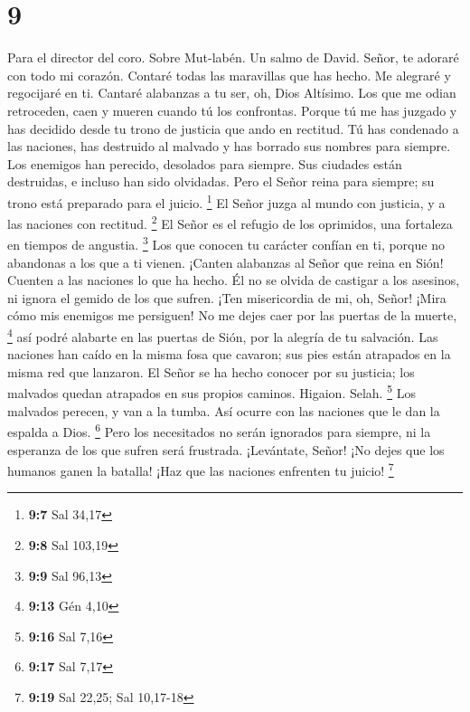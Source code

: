 \hypertarget{section-8}{%
\section{9}\label{section-8}}

Para el director del coro. Sobre Mut-labén. Un salmo de David.
 Señor, te adoraré con todo mi corazón. Contaré todas las
maravillas que has hecho.  Me alegraré y regocijaré en ti.
Cantaré alabanzas a tu ser, oh, Dios Altísimo.  Los que me
odian retroceden, caen y mueren cuando tú los confrontas. 
Porque tú me has juzgado y has decidido desde tu trono de justicia que
ando en rectitud.  Tú has condenado a las naciones, has
destruido al malvado y has borrado sus nombres para siempre.
 Los enemigos han perecido, desolados para siempre. Sus
ciudades están destruidas, e incluso han sido olvidadas. 
Pero el Señor reina para siempre; su trono está preparado para el
juicio. \footnote{\textbf{9:7} Sal 34,17}  El Señor juzga al
mundo con justicia, y a las naciones con rectitud. \footnote{\textbf{9:8}
  Sal 103,19}  El Señor es el refugio de los oprimidos, una
fortaleza en tiempos de angustia. \footnote{\textbf{9:9} Sal 96,13}
 Los que conocen tu carácter confían en ti, porque no
abandonas a los que a ti vienen.  ¡Canten alabanzas al
Señor que reina en Sión! Cuenten a las naciones lo que ha hecho.
 Él no se olvida de castigar a los asesinos, ni ignora el
gemido de los que sufren.  ¡Ten misericordia de mi, oh,
Señor! ¡Mira cómo mis enemigos me persiguen! No me dejes caer por las
puertas de la muerte, \footnote{\textbf{9:13} Gén 4,10} 
así podré alabarte en las puertas de Sión, por la alegría de tu
salvación.  Las naciones han caído en la misma fosa que
cavaron; sus pies están atrapados en la misma red que lanzaron.
 El Señor se ha hecho conocer por su justicia; los malvados
quedan atrapados en sus propios caminos. Higaion. Selah. \footnote{\textbf{9:16}
  Sal 7,16}  Los malvados perecen, y van a la tumba. Así
ocurre con las naciones que le dan la espalda a Dios. \footnote{\textbf{9:17}
  Sal 7,17}  Pero los necesitados no serán ignorados para
siempre, ni la esperanza de los que sufren será frustrada. 
¡Levántate, Señor! ¡No dejes que los humanos ganen la batalla! ¡Haz que
las naciones enfrenten tu juicio! \footnote{\textbf{9:19} Sal 22,25; Sal
  10,17-18}

